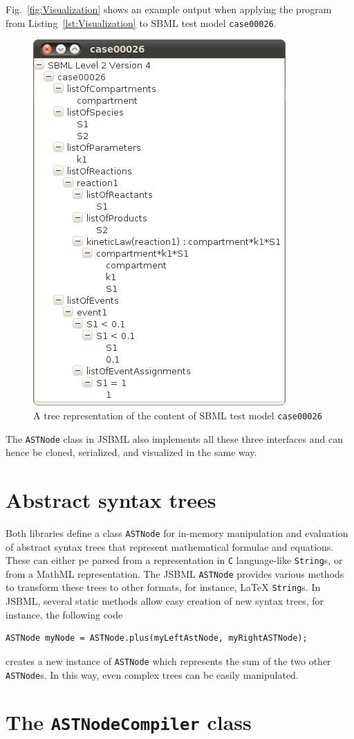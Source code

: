 \documentclass[
  letterpaper,
  12pt,
  headsepline,
  pointlessnumbers,
  tablecaptionabove,
  headinclude,
  appendixprefix,
  idxtotoc,
  bibtotoc
]{scrartcl}
\begin{document}
Fig.~\vref{fig:Visualization} shows an example output when applying the program from 
Listing~\vref{lst:Visualization} to SBML test model \texttt{case00026}.
\begin{figure}
\includegraphics[width=.35\textwidth]{posters/2010_ICSB_and_COMBINE/JSBMLvisualizerTransparent}
\caption[Tree representatation of an SBML file]{A tree representation of the content of SBML test model \texttt{case00026}}
\label{fig:Visualization}
\end{figure}
The \verb!ASTNode! class in JSBML also implements all these three interfaces and can hence
be cloned, serialized, and visualized in the same way.


\section{Abstract syntax trees}

Both libraries define a class \verb!ASTNode! for in-memory manipulation and evaluation
of abstract syntax trees that represent mathematical formulae and equations. These
can either pe parsed from a representation in \verb!C! language-like \verb!String!s,
or from a MathML representation. The JSBML \verb!ASTNode! provides various methods
to transform these trees to other formats, for instance, \LaTeX{} \verb!String!s.
In JSBML, several static methods allow easy creation of new syntax trees, for instance,
the following code
\begin{verbatim}
ASTNode myNode = ASTNode.plus(myLeftAstNode, myRightASTNode);
\end{verbatim}
creates a new instance of \verb!ASTNode! which represents the sum of the two other
\verb!ASTNode!s. In this way, even complex trees can be easily manipulated.

\section{The \texttt{ASTNodeCompiler} class}
\end{document}
